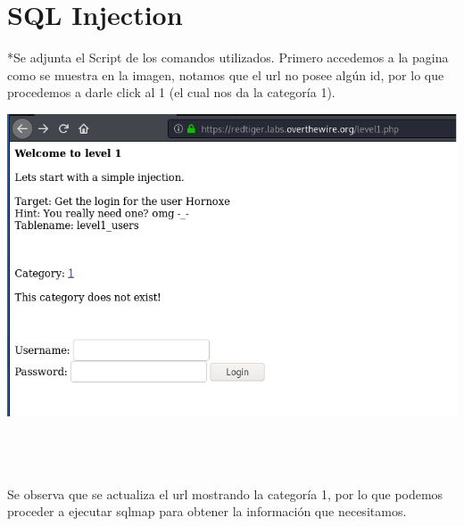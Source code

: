 \documentclass[11pt,letterpaper]{article}
\begin{document}
\section{SQL Injection}
*Se adjunta el Script de los comandos utilizados.
Primero accedemos a la pagina como se muestra en la imagen, notamos que el url no posee algún id, por lo que procedemos a darle click al 1 (el cual nos da la categoría 1).\\
\begin{center}
\includegraphics[scale=.6]{./Img/sqlmap0.png}
\end{center}~\\~\\~\\
Se observa que se actualiza el url mostrando la categoría 1, por lo que podemos proceder a ejecutar sqlmap para obtener la información que necesitamos.\\
\end{document}
